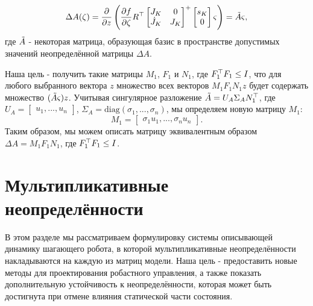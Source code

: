 \begin{equation}
	\Delta {A}(\zeta) = 
	\frac{\partial}{\partial z} 
	\left (
	\frac{\partial f}{\partial \zeta} {R}^\top 
	\begin{bmatrix}
		{J}_K & 0 \\ \dot{{J}}_K & {J}_K
	\end{bmatrix}^+ 
	\begin{bmatrix}
		s_K \\ 0
	\end{bmatrix} \varsigma 
	\right )
	= \Tilde{A} \varsigma,
\end{equation}
%
где $\Tilde{A}$ - некоторая матрица, образующая базис в пространстве допустимых значений неопределённой матрицы $\Delta {A}$.

Наша цель - получить такие матрицы ${M}_1$, ${F}_1$ и ${N}_1$, где ${F}_1^\top {F}_1 \leq {I}$, что для любого выбранного вектора $z$ множество всех векторов ${M}_1 {F}_1 {N}_1 z$ будет содержать множество $(\Tilde{A} \varsigma) z$. Учитывая сингулярное разложение $\Tilde{A} = {U}_A {\Sigma}_A {N}_1^\top$, где 
${U}_A = \begin{bmatrix}
	{u}_1, ..., {u}_n
\end{bmatrix}$, 
${\Sigma}_A = \text{diag}(\sigma_1, ..., \sigma_n)$, мы определяем новую матрицу ${M}_1$:
%
\begin{equation}
	{M}_1 = 
	\begin{bmatrix}
		\sigma_1{u}_1, ..., \sigma_n{u}_n
	\end{bmatrix}.
\end{equation}
Таким образом, мы можем описать матрицу эквивалентным образом $\Delta {A} = {M}_1 {F}_1 {N}_1$, где ${F}_1^\top{F}_1\leq {I}$.

\section{Мультипликативные неопределённости}\label{sec:ch3/sect2}
В этом разделе мы рассматриваем формулировку системы описывающей динамику шагающего робота, в которой мультипликативные неопределённости накладываются на каждую из матриц модели. Наша цель - предоставить новые методы для проектирования робастного управления, а также показать дополнительную устойчивость к неопределённости, которая может быть достигнута при отмене влияния статической части состояния.

